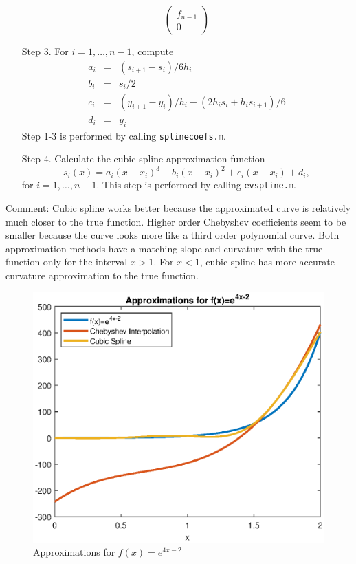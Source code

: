 \documentclass[11pt]{article}
\newcommand{\1}{\mathbbm{1}}
\begin{document}
\begin{enumerate}
\[\begin{pmatrix}
f_{n-1}\\
0
\end{pmatrix} \]
	\item[Step 3.] For $i=1,\ldots, n-1$, compute
	\begin{eqnarray*}
	    a_i&=&(s_{i+1}-s_i)/6h_i\\
		b_i&=&s_i/2\\
		c_i&=&(y_{i+1}-y_i)/h_i-(2h_is_i+h_is_{i+1})/6\\
		d_i&=&y_i
	\end{eqnarray*}
 	Step 1-3 is performed by calling \texttt{splinecoefs.m}.
	\item[Step 4.] Calculate the cubic spline approximation function
	\[s_i(x) = a_i(x-x_i)^3 +b_i(x-x_i)^2+c_i(x-x_i)+d_i, \]
	for $i=1,\ldots,n-1$. This step is performed by calling \texttt{evspline.m}.
\end{enumerate}

Comment: Cubic spline works better because the approximated curve is relatively much closer to the true function. Higher order Chebyshev coefficients seem to be smaller because the curve looks more like a third order polynomial curve. Both approximation methods have a matching slope and curvature with the true function only for the interval $x>1$. For $x<1$, cubic spline has more accurate curvature approximation to the true function.

\begin{figure}[h]
	\centering
		\includegraphics[width=\textwidth]{fig1.eps}
	\caption{Approximations for $f(x)=e^{4x-2}$}
	\label{2a:1}
\end{figure}
\end{document}
